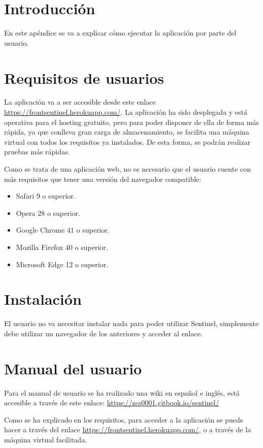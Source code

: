 
\section{Introducción}
En este apéndice se va a explicar cómo ejecutar la aplicación por parte del usuario.

\section{Requisitos de usuarios}
La aplicación va a ser accesible desde este enlace \url{https://frontsentinel.herokuapp.com/}. 
La aplicación ha sido desplegada y está operativa para el hosting gratuito, pero para poder disponer de ella de forma más rápida, ya que conlleva gran carga de almacenamiento, se facilita una máquina virtual con todos los requisitos ya instalados. De esta forma, se podrán realizar pruebas más rápidas.

Como se trata de una aplicación web, no es necesario que el usuario cuente con más requisitos que tener una versión del navegador compatible:

\begin{itemize}
\tightlist
    \item Safari 9 o superior.
    \item Opera 28 o superior.
    \item Google Chrome 41 o superior.
    \item Mozilla Firefox 40 o superior.
    \item Microsoft Edge 12 o superior.
\end{itemize}



\section{Instalación}
El usuario no va necesitar instalar nada para poder utilizar Sentinel, simplemente debe utilizar un navegador de los anteriores y acceder al enlace.

\section{Manual del usuario}
Para el manual de usuario se ha realizado una wiki en español e inglés, está accesible a través de este enlace: 
\url{https://zcs0001.gitbook.io/sentinel/}

Como se ha explicado en los requisitos, para acceder a la aplicación se puede hacer a través del enlace \url{https://frontsentinel.herokuapp.com/}, o a través de la máquina virtual facilitada.

